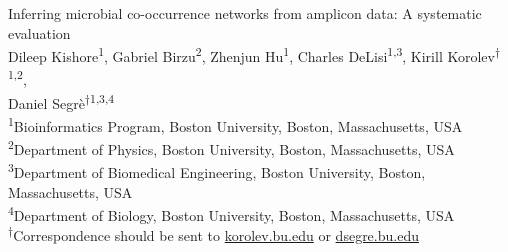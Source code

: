 
\begin{titlepage}

  \newcommand{\HRule}{\rule{\linewidth}{0.5mm}} %

  \center %





  \vspace*{\fill}
  {\huge Inferring microbial co-occurrence networks from amplicon data: A systematic evaluation}\\[0.4cm]


  \vspace{1.5 cm}
  Dileep Kishore\textsuperscript{1},
  Gabriel Birzu\textsuperscript{2},
  Zhenjun Hu\textsuperscript{1},
  Charles DeLisi\textsuperscript{1,3},
  Kirill Korolev\textsuperscript{$\dagger$1,2},\\
  Daniel Segr\`{e}\textsuperscript{$\dagger$1,3,4}\\
  \vspace{1cm}
  \textsuperscript{1}Bioinformatics Program, Boston University, Boston, Massachusetts, USA\\
  \textsuperscript{2}Department of Physics, Boston University, Boston, Massachusetts, USA\\
  \textsuperscript{3}Department of Biomedical Engineering, Boston University, Boston, Massachusetts, USA\\
  \textsuperscript{4}Department of Biology, Boston University, Boston, Massachusetts, USA\\
  \textsuperscript{$\dagger$}Correspondence should be sent to \href{mailto:korolev.bu.edu}{korolev.bu.edu} or \href{mailto:dsegre.bu.edu}{dsegre.bu.edu}\\


\end{titlepage}

